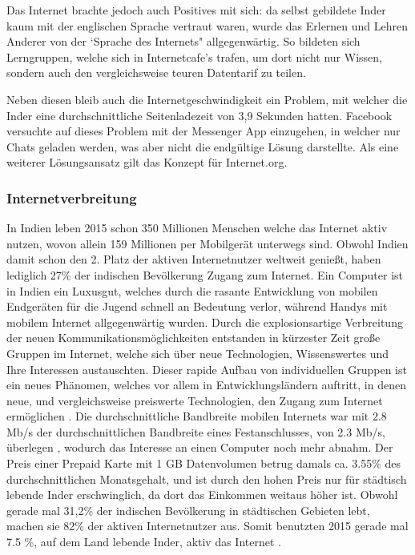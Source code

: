 \documentclass{article}
\begin{document}
\medskip

Das Internet brachte jedoch auch Positives mit sich: da selbst gebildete Inder kaum mit der englischen Sprache vertraut waren, wurde das Erlernen und Lehren Anderer von der `Sprache des Internets" allgegenwärtig.
So bildeten sich Lerngruppen, welche sich in Internetcafe's trafen, um dort nicht nur Wissen, sondern auch den vergleichsweise teuren Datentarif zu teilen.

Neben diesen bleib auch die Internetgeschwindigkeit ein Problem, mit welcher die Inder eine durchschnittliche Seitenladezeit von 3,9 Sekunden hatten\autocite{mashable}.
Facebook versuchte auf dieses Problem mit der Messenger App einzugehen, in welcher nur Chats geladen werden, was aber nicht die endgültige Lösung darstellte.
Als eine weiterer Lösungsansatz gilt das Konzept für Internet.org.

\subsubsection{Internetverbreitung}

In Indien leben 2015 schon 350 Millionen Menschen welche das Internet aktiv nutzen\autocite{slideshareIndia}, wovon allein 159 Millionen per Mobilgerät unterwegs sind.
Obwohl Indien damit schon den 2. Platz der aktiven Internetnutzer weltweit genießt, haben lediglich 27\% der indischen Bevölkerung Zugang zum Internet\autocite{InternetCountry}.
\medskip 
Ein Computer ist in Indien ein Luxusgut, welches durch die rasante Entwicklung von mobilen Endgeräten für die Jugend schnell an Bedeutung verlor, während Handys mit mobilem Internet allgegenwärtig wurden.
Durch die explosionsartige Verbreitung der neuen Kommunikationsmöglichkeiten entstanden in kürzester Zeit große Gruppen im Internet, welche sich über neue Technologien, Wissenswertes und Ihre Interessen austauschten.
Dieser rapide Aufbau von individuellen Gruppen ist ein neues Phänomen, welches vor allem in Entwicklungsländern auftritt, in denen neue, und vergleichsweise preiswerte Technologien, den Zugang zum Internet ermöglichen \textcite{empowermentThroughFacebook}.
\medskip
Die durchschnittliche Bandbreite mobilen Internets war mit 2.8 Mb/s der durchschnittlichen Bandbreite eines Festanschlusses, von 2.3 Mb/s, überlegen \autocite{slideshareIndia}, wodurch das Interesse an einen Computer noch mehr abnahm.
Der Preis einer Prepaid Karte mit 1 GB Datenvolumen betrug damals ca. 3.55\% des durchschnittlichen Monatsgehalt\autocite{broadbandAgency}, und ist durch den hohen Preis nur für städtisch lebende Inder erschwinglich, da dort das Einkommen weitaus höher ist.
Obwohl gerade mal 31,2\% der indischen Bevölkerung in städtischen Gebieten lebt, machen sie 82\% der aktiven Internetnutzer aus\autocite{IndiaBevölkerung}.
Somit benutzten 2015 gerade mal 7.5 \%, auf dem Land lebende Inder, aktiv das Internet \autocite{slideshareIndia}.
\end{document}
